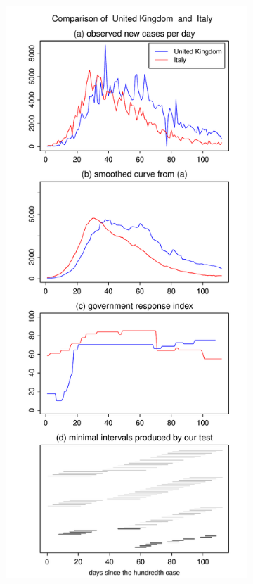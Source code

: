 \documentclass[a4paper,12pt]{article}
\numberwithin{equation}{section}
\begin{document}
\begin{figure}[t!]
\begin{subfigure}[b]{0.475\textwidth}
\end{subfigure}\hspace{0.25cm}
\begin{subfigure}[b]{0.475\textwidth}
\includegraphics[width=\textwidth]{plots/GBR_vs_ITA}
\end{subfigure}
\end{figure}
\end{document}
